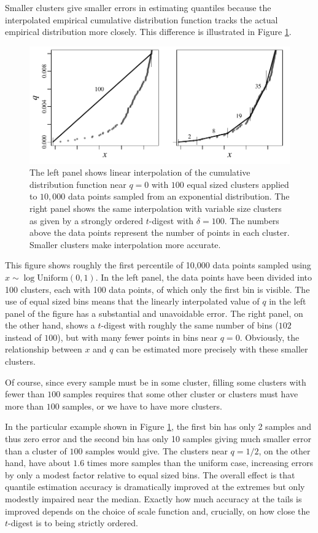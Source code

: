 \documentclass{vldb}
\begin{document}
Smaller clusters give smaller errors in estimating quantiles because the interpolated empirical cumulative distribution function tracks the actual empirical distribution more closely. This difference is illustrated in Figure \ref{fig:linear-interpolation}.
\begin{figure}[htb] %
   \centering
   \includegraphics[height=2.in, clip]{figures/linear-interpolation.pdf} 
   \caption{The left panel shows linear interpolation of the cumulative distribution function near $q=0$ with $100$ equal sized clusters applied to $10,000$ data points sampled from an exponential distribution. The right panel shows the same interpolation with variable size clusters as given by a strongly ordered $t$-digest with $\delta=100$. The numbers above the data points represent the number of points in each cluster. Smaller clusters make interpolation more accurate.}
   \label{fig:linear-interpolation}
\end{figure}
This figure shows roughly the first percentile of 10,000 data points sampled using $x \sim \log  \mathrm{Uniform}(0,1)$. In the left panel, the data points have been divided into 100 clusters, each with 100 data points, of which only the first bin is visible. The use of equal sized bins means that the linearly interpolated value of $q$ in the left panel of the figure has a substantial and unavoidable error. The right panel, on the other hand, shows a $t$-digest with roughly the same number of bins ($102$ instead of $100$), but with many fewer points in bins near  $q=0$. Obviously, the relationship between $x$ and $q$ can be estimated more precisely with these smaller clusters.

Of course, since every sample must be in some cluster, filling some clusters with fewer than $100$ samples requires that some other cluster or clusters must have more than $100$ samples, or we have to have more clusters. 

In the particular example shown in Figure \ref{fig:linear-interpolation}, the first bin has only 2 samples and thus zero error and the second bin has only 10 samples giving much smaller error than a cluster of $100$ samples would give. The clusters near $q=1/2$, on the other hand, have about $1.6$ times more samples than the uniform case, increasing errors by only a modest factor relative to equal sized bins. The overall effect is that quantile estimation accuracy is dramatically improved at the extremes but only modestly impaired near the median. Exactly how much accuracy at the tails is improved depends on the choice of scale function and, crucially, on how close the $t$-digest is to being strictly ordered.
\end{document}
